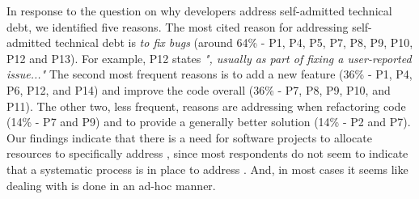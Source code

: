 In response to the question on why developers address self-admitted technical debt, we identified five reasons. The most cited reason for addressing self-admitted technical debt is \emph{to fix bugs} (around 64\% - P1, P4, P5, P7, P8, P9, P10, P12 and P13). For example, P12 states \textit{", usually as part of fixing a user-reported issue..."} The second most frequent reasons is to add a new feature (36\% - P1, P4, P6, P12, and P14) and improve the code overall (36\% - P7, P8, P9, P10, and P11). The other two, less frequent, reasons are addressing \SATD when refactoring code (14\% - P7 and P9) and to provide a generally better solution (14\% - P2 and P7). Our findings indicate that there is a need for software projects to allocate resources to specifically address \SATD, since most respondents do not seem to indicate that a systematic process is in place to address \SATD. And, in most cases it seems like dealing with \SATD is done in an ad-hoc manner.



 
 
 
% 
 
 